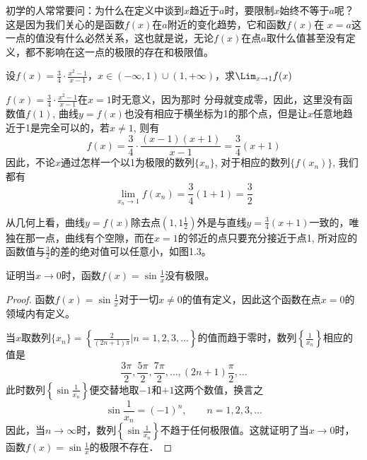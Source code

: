 初学的人常常要问：为什么在定义中谈到$x$趋近于$a$时，要限制$x$始终不等于$a$呢？这是因为我们关心的是函数$f(x)$在$a$附近的变化趋势，它和函数$f(x)$在
$x=a$这一点的值没有什么必然关系，这也就是说，无论$f(x)$在点$a$取什么值甚至没有定义，都不影响在这一点的极限的存在和极限值。

\begin{example}
设$f(x)=\frac{3}{4}\cdot \frac{x^2-1}{x-1}$，$x\in(-\infty,1)\cup(1,+\infty)$，求$\Lim_{x\to 1}f(x)$
\end{example}

\begin{solution}
    $f(x)=\frac{3}{4}\cdot \frac{x^2-1}{x-1}$在$x=1$时无意义，因为那时
    分母就变成零，因此，这里没有函数值$f(1)$, 曲线$y=f(x)$也没有相应于横坐标为1的那个点，但是让$x$任意地趋近于1是完全可以的，若$x\ne 1$, 则有
  \[  f (x) =\frac{3}{4}\cdot  \frac{(x-1)(x+1)}{x-1}=\frac{3}{4}(x+1)\]
  因此，不论$x$通过怎样一个以1为极限的数列$\{x_n\}$, 对于相应的数列$\{f(x_n)\}$, 我们都有
  \[\lim_{x_n\to 1} f (x_n) =\frac{3}{4} (1+1) =\frac{3}{2}\]

    从几何上看，曲线$y=f(x)$除去点$\left(1,1\frac{1}{2}\right)$外是与直线$y=\frac{3}{4}(x+1)$一致的，唯独在那一点，曲线有个空隙，而在$x=1$的邻近的点只要充分接近于点1, 所对应的函数值与$\frac{3}{2}$的差的绝对值可以任意小，如图1.3。
\end{solution}
    
\begin{figure}[htp]
    \centering
{}
    \caption{}
\end{figure}

\begin{example}
证明当$x\to 0$时，函数$f(x)=\sin\frac{1}{x}$没有极限。
\end{example}

\begin{proof}
函数$f(x)=\sin\frac{1}{x}$对于一切$x\ne 0$的值有定义，因此这个函数在点$x=0$的领域内有定义。

当$x$取数列$\{x_n\}=\left\{\frac{2}{(2n+1)\pi}\Big| n=1,2,3,\ldots\right\}$的值而趋于零时，数列$\left\{\frac{1}{x_n}\right\}$相应的值是
\[\frac{3\pi}{2},\frac{5\pi}{2},\frac{7\pi}{2},\ldots,(2n+1)\frac{\pi}{2},\ldots\]
此时数列$\left\{\sin\frac{1}{x_n}\right\}$便交替地取$-1$和$+1$这两个数值，换言之
\[\sin\frac{1}{x_n}=(-1)^n,\qquad n=1,2,3,\ldots\]
因此，当$n\to\infty$时，数列$\left\{\sin\frac{1}{x_n}\right\}$不趋于任何极限值。这就证明了当$x\to 0$时，函数$f(x)=\sin\frac{1}{x}$的极限不存在．
\end{proof}

